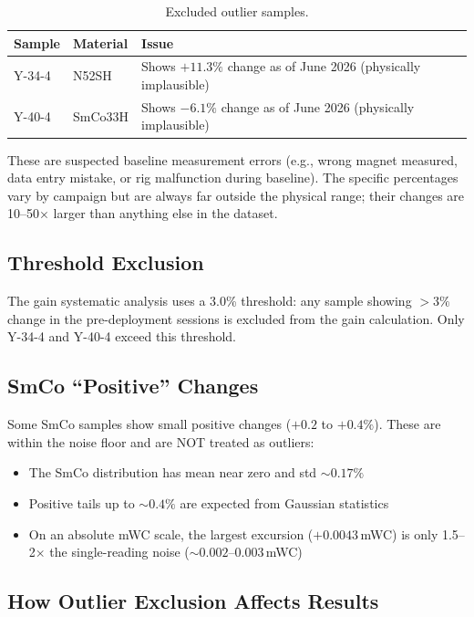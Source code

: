 \documentclass[11pt,letterpaper]{article}
\begin{document}
\begin{table}[htbp]
\centering
\caption{Excluded outlier samples.}
\label{tab:outliers}
\begin{tabular}{@{}llp{8cm}@{}}
\toprule
Sample & Material & Issue \\
\midrule
Y-34-4 & N52SH   & Shows $+11.3\%$ change as of June 2026 (physically implausible) \\
Y-40-4 & SmCo33H & Shows $-6.1\%$ change as of June 2026 (physically implausible) \\
\bottomrule
\end{tabular}
\end{table}

These are suspected baseline measurement errors (e.g., wrong magnet measured,
data entry mistake, or rig malfunction during baseline). The specific percentages
vary by campaign but are always far outside the physical range; their changes are
10--50$\times$ larger than anything else in the dataset.

\subsection{Threshold Exclusion}

The gain systematic analysis uses a 3.0\% threshold: any sample showing $>3\%$
change in the pre-deployment sessions is excluded from the gain calculation. Only
Y-34-4 and Y-40-4 exceed this threshold.

\subsection{SmCo ``Positive'' Changes}

Some SmCo samples show small positive changes ($+0.2$ to $+0.4\%$). These are
within the noise floor and are NOT treated as outliers:

\begin{itemize}[nosep]
  \item The SmCo distribution has mean near zero and std ${\sim}0.17\%$
  \item Positive tails up to ${\sim}0.4\%$ are expected from Gaussian statistics
  \item On an absolute mWC scale, the largest excursion ($+0.0043$\,mWC) is only
    1.5--2$\times$ the single-reading noise (${\sim}0.002$--$0.003$\,mWC)
\end{itemize}

\subsection{How Outlier Exclusion Affects Results}
\end{document}
